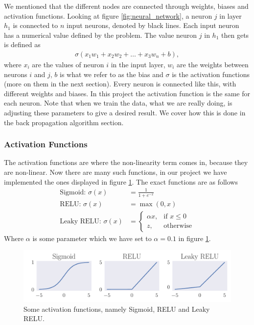 \documentclass[12pt]{extarticle}
\begin{document}
We mentioned that the different nodes are connected through weights, biases and activation functions. Looking at figure \ref{fig:neural_network}, a neuron $j$ in layer $h_1$ is connected to $n$ input neurons, denoted by black lines. Each input neuron has a numerical value defined by the problem. The value neuron $j$ in $h_1$ then gets is defined as
\begin{align}
\sigma (x_1w_1 + x_2w_2 + \dots + x_3w_n + b),
\end{align}
where $x_i$ are the values of neuron $i$ in the input layer, $w_i$ are the weights between neurons $i$ and $j$, $b$ is what we refer to as the bias and $\sigma$ is the activation functions (more on them in the next section). Every neuron is connected like this, with different weights and biases. In this project the activation function is the same for each neuron. Note that when we train the data, what we are really doing, is adjusting these parameters to give a desired result. We cover how this is done in the back propagation algorithm section.

\subsubsection{Activation Functions}
The activation functions are where the non-linearity term comes in, because they are non-linear. Now there are many such functions, in our project we have implemented the ones displayed in figure \ref{fig:activation_functions}. The exact functions are as follows
\begin{align}
	\text{Sigmoid: }\sigma(x) &= \frac{1}{1 + e^{-x}}\label{eq:sigmoid} \\
	\text{RELU: }\sigma(x) &= \max(0,x) \label{eq:RELU} \\
	\text{Leaky RELU: }\sigma(x) &= \begin{cases}
	\alpha x,& \text{if } x\leq 0 \\
	z,& \text{otherwise} 
	\end{cases} \label{eq:leaky_RELU}
\end{align}
Where $\alpha$ is some parameter which we have set to $\alpha = 0.1$ in figure \ref{fig:activation_functions}.

\begin{figure}[h]
	\includegraphics[width=\linewidth]{pictures/activation_functions.pdf}
	\caption{Some activation functions, namely Sigmoid, RELU and Leaky RELU.}\label{fig:activation_functions}
\end{figure}
\end{document}
